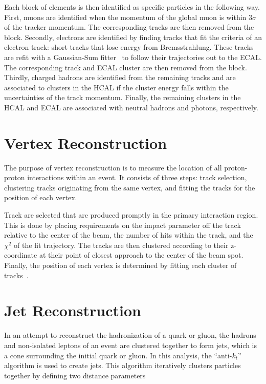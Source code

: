 Each block of elements is then identified as specific particles in the following way. First, muons are identified when the momentum of the global muon is within $3 \sigma$ of the tracker momentum. The corresponding tracks are then removed from the block. Secondly, electrons are identified by finding tracks that fit the criteria of an electron track: short tracks that lose energy from Bremsstrahlung. These tracks are refit with a Gaussian-Sum fitter~\cite{GausSumFilter} to follow their trajectories out to the ECAL. The corresponding track and ECAL cluster are then removed from the block. Thirdly, charged hadrons are identified from the remaining tracks and are associated to clusters in the HCAL if the cluster energy falls within the uncertainties of the track momentum. Finally, the remaining clusters in the HCAL and ECAL are associated with neutral hadrons and photons, respectively. 

\section{Vertex Reconstruction}

The purpose of vertex reconstruction is to measure the location of all proton-proton interactions within an event. It consists of three steps: track selection, clustering tracks originating from the same vertex, and fitting the tracks for the position of each vertex. 

Track are selected that are produced promptly in the primary interaction region. This is done by placing requirements on the impact parameter off the track relative to the center of the beam, the number of hits within the track, and the $\chi^{2}$ of the fit trajectory. The tracks are then clustered according to their z-coordinate at their point of closest approach to the center of the beam spot. Finally, the position of each vertex is determined by fitting each cluster of tracks~\cite{TrackReco}. 

\section{Jet Reconstruction}
In an attempt to reconstruct the hadronization of a quark or gluon, the hadrons and non-isolated leptons of an event are clustered together to form jets, which is a cone surrounding the initial quark or gluon. In this analysis, the ``anti-$k_{t}$'' algorithm is used to create jets. This algorithm iteratively clusters particles together by defining two distance parameters

